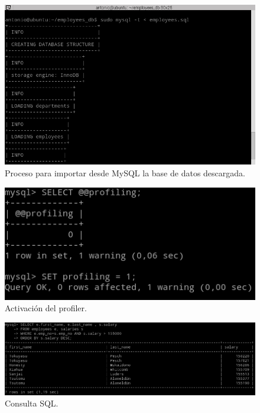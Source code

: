 \begin{figure}[H]
  \begin{center}
    \includegraphics[width=1\textwidth]{imagenes/importacion}
    \caption{Proceso para importar desde MySQL la base de datos descargada.}
    \label{fig24}
  \end{center}
\end{figure}

\begin{figure}[H]
  \begin{center}
    \includegraphics[width=1\textwidth]{imagenes/prof}
    \caption{Activación del profiler.}
    \label{fig25}
  \end{center}
\end{figure}

\begin{figure}[H]
  \begin{center}
    \includegraphics[width=1\textwidth]{imagenes/consulta}
    \caption{Consulta SQL.}
    \label{fig26}
  \end{center}
\end{figure}

